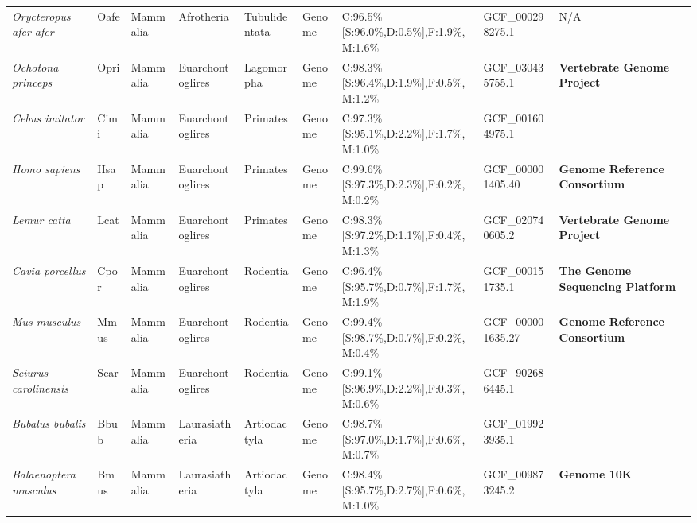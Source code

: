 \documentclass[../main.tex]{subfiles}
\begin{document}
\begin{landscape}
\begin{longtable}{lllllllll}
		\textit{Orycteropus afer afer}          & Oafe        & Mammalia       & Afrotheria       & Tubulidentata   & Genome        & C:96.5\%{[}S:96.0\%,D:0.5\%{]},F:1.9\%,M:1.6\% & GCF\_000298275.1       & N/A                                       \\
		\textit{Ochotona princeps}              & Opri        & Mammalia       & Euarchontoglires & Lagomorpha      & Genome        & C:98.3\%{[}S:96.4\%,D:1.9\%{]},F:0.5\%,M:1.2\% & GCF\_030435755.1       & \textbf{Vertebrate Genome Project}        \\
		\textit{Cebus imitator}                 & Cimi        & Mammalia       & Euarchontoglires & Primates        & Genome        & C:97.3\%{[}S:95.1\%,D:2.2\%{]},F:1.7\%,M:1.0\% & GCF\_001604975.1       & \textbf{\cite{orkin2021genomics}}         \\
		\textit{Homo sapiens}                   & Hsap        & Mammalia       & Euarchontoglires & Primates        & Genome        & C:99.6\%{[}S:97.3\%,D:2.3\%{]},F:0.2\%,M:0.2\% & GCF\_000001405.40      & \textbf{Genome Reference Consortium}      \\
		\textit{Lemur catta}                    & Lcat        & Mammalia       & Euarchontoglires & Primates        & Genome        & C:98.3\%{[}S:97.2\%,D:1.1\%{]},F:0.4\%,M:1.3\% & GCF\_020740605.2       & \textbf{Vertebrate Genome Project}        \\
		\textit{Cavia porcellus}                & Cpor        & Mammalia       & Euarchontoglires & Rodentia        & Genome        & C:96.4\%{[}S:95.7\%,D:0.7\%{]},F:1.7\%,M:1.9\% & GCF\_000151735.1       & \textbf{The Genome Sequencing Platform}   \\
		\textit{Mus musculus}                   & Mmus        & Mammalia       & Euarchontoglires & Rodentia        & Genome        & C:99.4\%{[}S:98.7\%,D:0.7\%{]},F:0.2\%,M:0.4\% & GCF\_000001635.27      & \textbf{Genome Reference Consortium}      \\
		\textit{Sciurus carolinensis}           & Scar        & Mammalia       & Euarchontoglires & Rodentia        & Genome        & C:99.1\%{[}S:96.9\%,D:2.2\%{]},F:0.3\%,M:0.6\% & GCF\_902686445.1       & \textbf{\cite{mead2020genome}}            \\
		\textit{Bubalus bubalis}                & Bbub        & Mammalia       & Laurasiatheria   & Artiodactyla    & Genome        & C:98.7\%{[}S:97.0\%,D:1.7\%{]},F:0.6\%,M:0.7\% & GCF\_019923935.1       & \textbf{\cite{deng2016novo}}              \\
		\textit{Balaenoptera musculus}          & Bmus        & Mammalia       & Laurasiatheria   & Artiodactyla    & Genome        & C:98.4\%{[}S:95.7\%,D:2.7\%{]},F:0.6\%,M:1.0\% & GCF\_009873245.2       & \textbf{Genome 10K}                       \\

\end{longtable}
\end{landscape}
\end{document}
